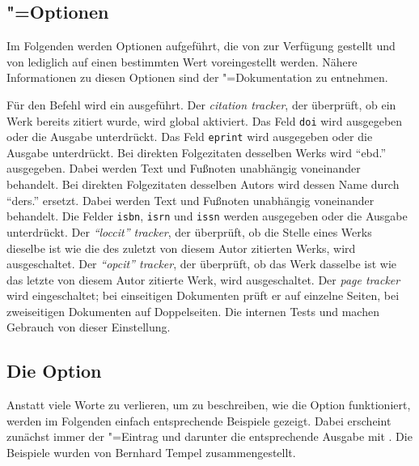 \documentclass[ngerman]{scrartcl}
\begin{document}
\subsection{\texorpdfstring{\bl"=}{biblatex-}Optionen}
Im Folgenden werden Optionen aufgeführt, die von \bl{} zur Verfügung gestellt und von \bldw{} lediglich auf einen bestimmten Wert voreingestellt werden. Nähere Informationen zu diesen Optionen sind der \bl"=Dokumentation zu entnehmen.

	  Für den Befehl  wird ein  ausgeführt.
    Der \emph{citation tracker}, der überprüft, ob ein Werk bereits zitiert
    wurde, wird global aktiviert.
	  Das Feld \texttt{doi} wird ausgegeben oder die Ausgabe unterdrückt.
	  Das Feld \texttt{eprint} wird ausgegeben oder die Ausgabe unterdrückt.
	  Bei direkten Folgezitaten desselben Werks wird \enquote{ebd.} ausgegeben.
	  Dabei werden Text und Fußnoten unabhängig voneinander behandelt.
	  Bei direkten Folgezitaten desselben Autors wird dessen Name durch 
	  \enquote{ders.} ersetzt. Dabei werden Text und Fußnoten unabhängig
	  voneinander behandelt.
	  Die Felder \texttt{isbn}, \texttt{isrn} und \texttt{issn} werden
		ausgegeben oder die Ausgabe unterdrückt.
    Der \emph{\enquote{loccit} tracker}, der überprüft, ob die Stelle eines
    Werks dieselbe ist wie die des zuletzt von diesem Autor zitierten Werks,
    wird ausgeschaltet.  
    Der \emph{\enquote{opcit} tracker}, der überprüft, ob das Werk dasselbe
    ist wie das letzte von diesem Autor zitierte Werk, wird ausgeschaltet.
    Der \emph{page tracker} wird eingeschaltet; bei einseitigen Dokumenten
    prüft er auf einzelne Seiten, bei zweiseitigen Dokumenten auf 
    Doppelseiten. Die internen Tests  und  
    machen Gebrauch von dieser Einstellung.

\subsection{Die Option }
\label{journalnumberdate}
Anstatt viele Worte zu verlieren, um zu beschreiben, wie die Option 
funktioniert, werden im Folgenden einfach entsprechende Beispiele
gezeigt. Dabei erscheint zunächst immer der \BibTeX"=Eintrag und darunter die
entsprechende Ausgabe mit . Die Beispiele wurden
von Bernhard Tempel zusammengestellt.
\end{document}
